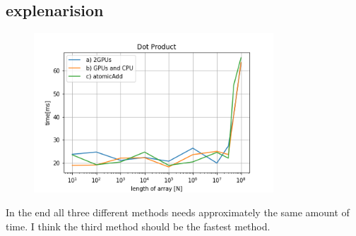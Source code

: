 \documentclass[11pt,a4paper]{article}
\begin{document}
\subsection*{explenarision}
\begin{figure}[H]
	\centering
	\includegraphics[width=0.80\textwidth]{Bilder/Dot_Prod.png}
\end{figure}
In the end all three different methods needs approximately the same amount of time. I think the third method should be the fastest method.
\end{document}
